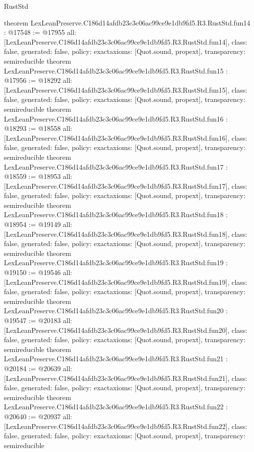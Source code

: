 \begin{lexlean}{RustStd}
\begin{coremodule}
{}
theorem LexLeanPreserve.C186d14afdb23c3c06ac99ce9e1db9fd5.R3.RustStd.fun14 : @17548 := @17955 {
  all: [LexLeanPreserve.C186d14afdb23c3c06ac99ce9e1db9fd5.R3.RustStd.fun14],
  class: false,
  generated: false,
  policy: exact{axioms: [Quot.sound, propext]},
  transparency: semireducible
}
theorem LexLeanPreserve.C186d14afdb23c3c06ac99ce9e1db9fd5.R3.RustStd.fun15 : @17956 := @18292 {
  all: [LexLeanPreserve.C186d14afdb23c3c06ac99ce9e1db9fd5.R3.RustStd.fun15],
  class: false,
  generated: false,
  policy: exact{axioms: [Quot.sound, propext]},
  transparency: semireducible
}
theorem LexLeanPreserve.C186d14afdb23c3c06ac99ce9e1db9fd5.R3.RustStd.fun16 : @18293 := @18558 {
  all: [LexLeanPreserve.C186d14afdb23c3c06ac99ce9e1db9fd5.R3.RustStd.fun16],
  class: false,
  generated: false,
  policy: exact{axioms: [Quot.sound, propext]},
  transparency: semireducible
}
theorem LexLeanPreserve.C186d14afdb23c3c06ac99ce9e1db9fd5.R3.RustStd.fun17 : @18559 := @18953 {
  all: [LexLeanPreserve.C186d14afdb23c3c06ac99ce9e1db9fd5.R3.RustStd.fun17],
  class: false,
  generated: false,
  policy: exact{axioms: [Quot.sound, propext]},
  transparency: semireducible
}
theorem LexLeanPreserve.C186d14afdb23c3c06ac99ce9e1db9fd5.R3.RustStd.fun18 : @18954 := @19149 {
  all: [LexLeanPreserve.C186d14afdb23c3c06ac99ce9e1db9fd5.R3.RustStd.fun18],
  class: false,
  generated: false,
  policy: exact{axioms: [Quot.sound, propext]},
  transparency: semireducible
}
theorem LexLeanPreserve.C186d14afdb23c3c06ac99ce9e1db9fd5.R3.RustStd.fun19 : @19150 := @19546 {
  all: [LexLeanPreserve.C186d14afdb23c3c06ac99ce9e1db9fd5.R3.RustStd.fun19],
  class: false,
  generated: false,
  policy: exact{axioms: [Quot.sound, propext]},
  transparency: semireducible
}
theorem LexLeanPreserve.C186d14afdb23c3c06ac99ce9e1db9fd5.R3.RustStd.fun20 : @19547 := @20183 {
  all: [LexLeanPreserve.C186d14afdb23c3c06ac99ce9e1db9fd5.R3.RustStd.fun20],
  class: false,
  generated: false,
  policy: exact{axioms: [Quot.sound, propext]},
  transparency: semireducible
}
theorem LexLeanPreserve.C186d14afdb23c3c06ac99ce9e1db9fd5.R3.RustStd.fun21 : @20184 := @20639 {
  all: [LexLeanPreserve.C186d14afdb23c3c06ac99ce9e1db9fd5.R3.RustStd.fun21],
  class: false,
  generated: false,
  policy: exact{axioms: [Quot.sound, propext]},
  transparency: semireducible
}
theorem LexLeanPreserve.C186d14afdb23c3c06ac99ce9e1db9fd5.R3.RustStd.fun22 : @20640 := @20937 {
  all: [LexLeanPreserve.C186d14afdb23c3c06ac99ce9e1db9fd5.R3.RustStd.fun22],
  class: false,
  generated: false,
  policy: exact{axioms: [Quot.sound, propext]},
  transparency: semireducible
}
\end{coremodule}
\end{lexlean}
